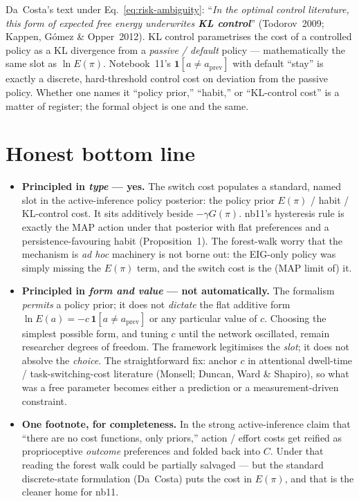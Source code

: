 \documentclass[11pt,a4paper]{article}
\theoremstyle{plain}
\begin{document}
Da~Costa's text under Eq.~\eqref{eq:risk-ambiguity}: ``\emph{In the
optimal control literature, this form of expected free energy
underwrites \textbf{KL control}}'' (Todorov~2009; Kappen, G\'omez \&
Opper~2012). KL control parametrises the cost of a controlled policy as
a KL divergence from a \emph{passive / default} policy ---
mathematically the same slot as $\ln E(\pi)$. Notebook~11's
$\mathbf{1}[a \neq a_{\mathrm{prev}}]$ with default ``stay'' is exactly
a discrete, hard-threshold control cost on deviation from the passive
policy. Whether one names it ``policy prior,'' ``habit,'' or
``KL-control cost'' is a matter of register; the formal object is one
and the same.

\section{Honest bottom line}

\begin{itemize}
\item \textbf{Principled in \emph{type} --- yes.} The switch cost
populates a standard, named slot in the active-inference policy
posterior: the policy prior $E(\pi)$ / habit / KL-control cost. It sits
additively beside $-\gamma G(\pi)$. nb11's hysteresis rule is exactly
the MAP action under that posterior with flat preferences and a
persistence-favouring habit (Proposition~1). The forest-walk worry that
the mechanism is \emph{ad hoc} machinery is not borne out: the EIG-only
policy was simply missing the $E(\pi)$ term, and the switch cost is the
(MAP limit of) it.

\item \textbf{Principled in \emph{form and value} --- not
automatically.} The formalism \emph{permits} a policy prior; it does not
\emph{dictate} the flat additive form $\ln E(a) = -c\,\mathbf{1}[a\neq
a_{\mathrm{prev}}]$ or any particular value of $c$. Choosing the
simplest possible form, and tuning $c$ until the network oscillated,
remain researcher degrees of freedom. The framework legitimises the
\emph{slot}; it does not absolve the \emph{choice}. The straightforward
fix: anchor $c$ in attentional dwell-time / task-switching-cost
literature (Monsell; Duncan, Ward \& Shapiro), so what was a free
parameter becomes either a prediction or a measurement-driven
constraint.

\item \textbf{One footnote, for completeness.} In the strong
active-inference claim that ``there are no cost functions, only
priors,'' action / effort costs get reified as proprioceptive
\emph{outcome} preferences and folded back into $C$. Under that reading
the forest walk could be partially salvaged --- but the standard
discrete-state formulation (Da~Costa) puts the cost in $E(\pi)$, and
that is the cleaner home for nb11.
\end{itemize}
\end{document}

